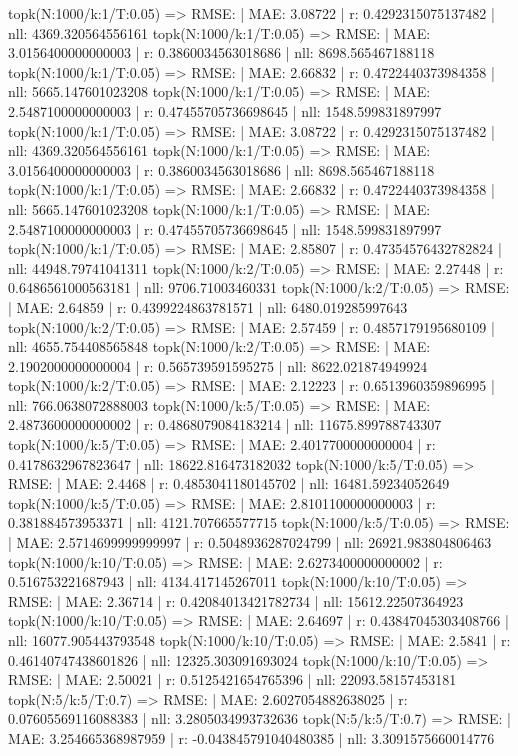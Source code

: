 topk(N:1000/k:1/T:0.05) => RMSE: | MAE: 3.08722 | r: 0.4292315075137482 | nll: 4369.320564556161
topk(N:1000/k:1/T:0.05) => RMSE: | MAE: 3.0156400000000003 | r: 0.3860034563018686 | nll: 8698.565467188118
topk(N:1000/k:1/T:0.05) => RMSE: | MAE: 2.66832 | r: 0.4722440373984358 | nll: 5665.147601023208
topk(N:1000/k:1/T:0.05) => RMSE: | MAE: 2.5487100000000003 | r: 0.47455705736698645 | nll: 1548.599831897997
topk(N:1000/k:1/T:0.05) => RMSE: | MAE: 3.08722 | r: 0.4292315075137482 | nll: 4369.320564556161
topk(N:1000/k:1/T:0.05) => RMSE: | MAE: 3.0156400000000003 | r: 0.3860034563018686 | nll: 8698.565467188118
topk(N:1000/k:1/T:0.05) => RMSE: | MAE: 2.66832 | r: 0.4722440373984358 | nll: 5665.147601023208
topk(N:1000/k:1/T:0.05) => RMSE: | MAE: 2.5487100000000003 | r: 0.47455705736698645 | nll: 1548.599831897997
topk(N:1000/k:1/T:0.05) => RMSE: | MAE: 2.85807 | r: 0.47354576432782824 | nll: 44948.79741041311
topk(N:1000/k:2/T:0.05) => RMSE: | MAE: 2.27448 | r: 0.6486561000563181 | nll: 9706.71003460331
topk(N:1000/k:2/T:0.05) => RMSE: | MAE: 2.64859 | r: 0.4399224863781571 | nll: 6480.019285997643
topk(N:1000/k:2/T:0.05) => RMSE: | MAE: 2.57459 | r: 0.4857179195680109 | nll: 4655.754408565848
topk(N:1000/k:2/T:0.05) => RMSE: | MAE: 2.1902000000000004 | r: 0.565739591595275 | nll: 8622.021874949924
topk(N:1000/k:2/T:0.05) => RMSE: | MAE: 2.12223 | r: 0.6513960359896995 | nll: 766.0638072888003
topk(N:1000/k:5/T:0.05) => RMSE: | MAE: 2.4873600000000002 | r: 0.4868079084183214 | nll: 11675.899788743307
topk(N:1000/k:5/T:0.05) => RMSE: | MAE: 2.4017700000000004 | r: 0.4178632967823647 | nll: 18622.816473182032
topk(N:1000/k:5/T:0.05) => RMSE: | MAE: 2.4468 | r: 0.4853041180145702 | nll: 16481.59234052649
topk(N:1000/k:5/T:0.05) => RMSE: | MAE: 2.8101100000000003 | r: 0.381884573953371 | nll: 4121.707665577715
topk(N:1000/k:5/T:0.05) => RMSE: | MAE: 2.5714699999999997 | r: 0.5048936287024799 | nll: 26921.983804806463
topk(N:1000/k:10/T:0.05) => RMSE: | MAE: 2.6273400000000002 | r: 0.516753221687943 | nll: 4134.417145267011
topk(N:1000/k:10/T:0.05) => RMSE: | MAE: 2.36714 | r: 0.42084013421782734 | nll: 15612.22507364923
topk(N:1000/k:10/T:0.05) => RMSE: | MAE: 2.64697 | r: 0.43847045303408766 | nll: 16077.905443793548
topk(N:1000/k:10/T:0.05) => RMSE: | MAE: 2.5841 | r: 0.46140747438601826 | nll: 12325.303091693024
topk(N:1000/k:10/T:0.05) => RMSE: | MAE: 2.50021 | r: 0.5125421654765396 | nll: 22093.58157453181
topk(N:5/k:5/T:0.7) => RMSE: | MAE: 2.6027054882638025 | r: 0.07605569116088383 | nll: 3.2805034993732636
topk(N:5/k:5/T:0.7) => RMSE: | MAE: 3.254665368987959 | r: -0.043845791040480385 | nll: 3.3091575660014776
